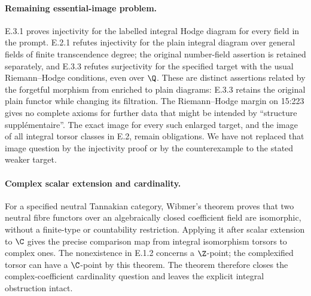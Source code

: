 \paragraph{Remaining essential-image problem.}
E.3.1 proves injectivity for the labelled integral Hodge diagram for every field in the prompt. E.2.1 refutes injectivity for the plain integral diagram over general fields of finite transcendence degree; the original number-field assertion is retained separately, and E.3.3 refutes surjectivity for the specified target with the usual Riemann--Hodge conditions, even over $\Q$. These are distinct assertions related by the forgetful morphism from enriched to plain diagrams: E.3.3 retains the original plain functor while changing its filtration. The Riemann--Hodge margin on 15:223 gives no complete axioms for further data that might be intended by ``structure suppl\'ementaire''. The exact image for every such enlarged target, and the image of all integral torsor classes in E.2, remain obligations. We have not replaced that image question by the injectivity proof or by the counterexample to the stated weaker target.

\paragraph{Complex scalar extension and cardinality.}
For a specified neutral Tannakian category, Wibmer's theorem \cite[Theorems 1.1--1.2]{Wibmer2025} proves that two neutral fibre functors over an algebraically closed coefficient field are isomorphic, without a finite-type or countability restriction. Applying it after scalar extension to $\C$ gives the precise comparison map from integral isomorphism torsors to complex ones. The nonexistence in E.1.2 concerns a $\Z$-point; the complexified torsor can have a $\C$-point by this theorem. The theorem therefore closes the complex-coefficient cardinality question and leaves the explicit integral obstruction intact.

